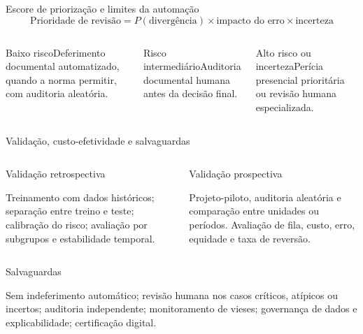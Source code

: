 \documentclass[presentation,aspectratio=169]{beamer}
\begin{document}
\begin{frame}[t]{Escore de priorização e limites da automação}
\[
\text{Prioridade de revisão} = P(\text{divergência}) \times \text{impacto do erro} \times \text{incerteza}
\]
\vspace{0.22cm}
\begin{columns}[T,onlytextwidth]
\begin{block}{Baixo risco}\small Deferimento documental automatizado, quando a norma permitir, com auditoria aleatória.\end{block}
\begin{block}{Risco intermediário}\small Auditoria documental humana antes da decisão final.\end{block}
\begin{block}{Alto risco ou incerteza}\small Perícia presencial prioritária ou revisão humana especializada.\end{block}
\end{columns}
\vfill
{}
\end{frame}

\begin{frame}[t]{Validação, custo-efetividade e salvaguardas}
\begin{columns}[T,onlytextwidth]
\begin{block}{Validação retrospectiva}
\begin{minipage}[t][1.60cm][t]{\linewidth}\raggedright\small
Treinamento com dados históricos; separação entre treino e teste; calibração do risco; avaliação por subgrupos e estabilidade temporal.
\end{minipage}
\end{block}
\begin{block}{Validação prospectiva}
\begin{minipage}[t][1.60cm][t]{\linewidth}\raggedright\small
Projeto-piloto, auditoria aleatória e comparação entre unidades ou períodos. Avaliação de fila, custo, erro, equidade e taxa de reversão.
\end{minipage}
\end{block}
\end{columns}
\vspace{0.24cm}
\begin{block}{Salvaguardas}\raggedright\small
Sem indeferimento automático; revisão humana nos casos críticos, atípicos ou incertos; auditoria independente; monitoramento de vieses; governança de dados e explicabilidade; certificação digital.
\end{block}
\vspace{0.18cm}
\end{frame}
\end{document}
